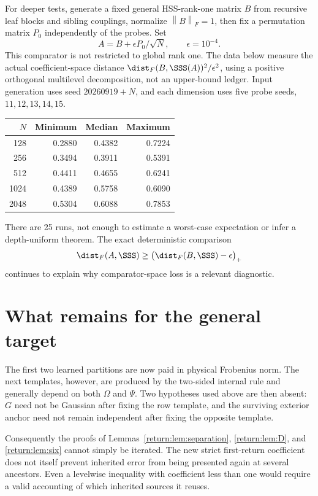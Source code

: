 \documentclass[11pt,oneside,openany,a4paper]{book}
\numberwithin{equation}{chapter}
\theoremstyle{definition}
\theoremstyle{remark}
\newcommand{\F}[1]{\left\lVert#1\right\rVert_F}
\begin{document}
For deeper tests, generate a fixed general HSS-rank-one matrix $B$ from recursive leaf blocks and sibling couplings, normalize $\F B=1$, then fix a permutation matrix $P_0$ independently of the probes. Set
\[
 A=B+\epsilon P_0/\sqrt N,\qquad\epsilon=10^{-4}.
\]
This comparator is not restricted to global rank one. The data below measure the actual coefficient-space distance
$\dist_F(B,\SSS(A))^2/\epsilon^2$, using a positive orthogonal multilevel decomposition, not an upper-bound ledger. Input generation uses seed $20260919+N$, and each dimension uses five probe seeds, $11,12,13,14,15$.
\begin{center}
\begin{tabular}{@{}rrrr@{}}\toprule
$N$ & Minimum & Median & Maximum\\\midrule
128  &0.2880&0.4382&0.7224\\
256  &0.3494&0.3911&0.5391\\
512  &0.4411&0.4655&0.6241\\
1024 &0.4389&0.5758&0.6090\\
2048 &0.5304&0.6088&0.7853\\\bottomrule
\end{tabular}
\end{center}
There are 25 runs, not enough to estimate a worst-case expectation or infer a depth-uniform theorem. The exact deterministic comparison
\[
 \dist_F(A,\SSS)\ge\big(\dist_F(B,\SSS)-\epsilon\big)_+
\]
continues to explain why comparator-space loss is a relevant diagnostic.

\section{What remains for the general target}
The first two learned partitions are now paid in physical Frobenius norm. The next templates, however, are produced by the two-sided internal rule and generally depend on both $\Omega$ and $\Psi$. Two hypotheses used above are then absent: $G$ need not be Gaussian after fixing the row template, and the surviving exterior anchor need not remain independent after fixing the opposite template.

Consequently the proofs of Lemmas~\ref{return:lem:separation}, \ref{return:lem:D}, and \ref{return:lem:six} cannot simply be iterated. The new strict first-return coefficient does not itself prevent inherited error from being presented again at several ancestors. Even a levelwise inequality with coefficient less than one would require a valid accounting of which inherited sources it reuses.
\end{document}
